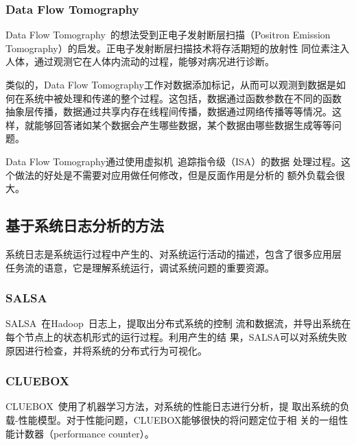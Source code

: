 \subsubsection*{Data Flow Tomography}

Data Flow Tomography~\cite{dft}的想法受到正电子发射断层扫描（Positron
Emission Tomography）的启发。正电子发射断层扫描技术将存活期短的放射性
同位素注入人体，通过观测它在人体内流动的过程，能够对病况进行诊断。

类似的，Data Flow Tomography工作对数据添加标记，从而可以观测到数据是如
何在系统中被处理和传递的整个过程。这包括，数据通过函数参数在不同的函数
抽象层传播，数据通过共享内存在线程间传播，数据通过网络传播等等情况。这
样，就能够回答诸如某个数据会产生哪些数据，某个数据由哪些数据生成等等问
题。

Data Flow Tomography通过使用虚拟机~\cite{qemu}追踪指令级（ISA）的数据
处理过程。这个做法的好处是不需要对应用做任何修改，但是反面作用是分析的
额外负载会很大。


\subsection{基于系统日志分析的方法}


系统日志是系统运行过程中产生的、对系统运行活动的描述，包含了很多应用层
任务流的语意，它是理解系统运行，调试系统问题的重要资源。

\subsubsection*{SALSA}

SALSA~\cite{salsa}在Hadoop~\cite{hadoop}日志上，提取出分布式系统的控制
流和数据流，并导出系统在每个节点上的状态机形式的运行过程。利用产生的结
果，SALSA可以对系统失败原因进行检查，并将系统的分布式行为可视化。

\subsubsection*{CLUEBOX}

CLUEBOX~\cite{cluebox}使用了机器学习方法，对系统的性能日志进行分析，提
取出系统的负载-性能模型。对于性能问题，CLUEBOX能够很快的将问题定位于相
关的一组性能计数器（performance counter）。

